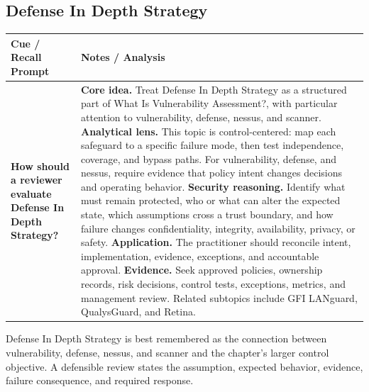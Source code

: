 \documentclass[11pt]{article}
\newcommand{\CornellHeader}{%
\rowcolor{Navy}\color{white}\bfseries Cue / Recall Prompt & \color{white}\bfseries Notes / Analysis\\\hline}
\newcommand{\CornellRow}[2]{%
\cellcolor{CueGray}\RaggedRight\textbf{#1} & \RaggedRight #2\\\hline}
\begin{document}
\subsection*{Defense In Depth Strategy}
\begin{longtable}{>{\RaggedRight\arraybackslash}p{}|>{\RaggedRight\arraybackslash}p{}}
\CornellHeader
\CornellRow{How should a reviewer evaluate Defense In Depth Strategy?}{\textbf{Core idea.} Treat Defense In Depth Strategy as a structured part of What Is Vulnerability Assessment?, with particular attention to vulnerability, defense, nessus, and scanner. \textbf{Analytical lens.} This topic is control-centered: map each safeguard to a specific failure mode, then test independence, coverage, and bypass paths. For vulnerability, defense, and nessus, require evidence that policy intent changes decisions and operating behavior. \textbf{Security reasoning.} Identify what must remain protected, who or what can alter the expected state, which assumptions cross a trust boundary, and how failure changes confidentiality, integrity, availability, privacy, or safety. \textbf{Application.} The practitioner should reconcile intent, implementation, evidence, exceptions, and accountable approval. \textbf{Evidence.} Seek approved policies, ownership records, risk decisions, control tests, exceptions, metrics, and management review. Related subtopics include GFI LANguard, QualysGuard, and Retina.}
\end{longtable}
\begin{topicsummary}
Defense In Depth Strategy is best remembered as the connection between vulnerability, defense, nessus, and scanner and the chapter's larger control objective. A defensible review states the assumption, expected behavior, evidence, failure consequence, and required response.
\end{topicsummary}
\end{document}
